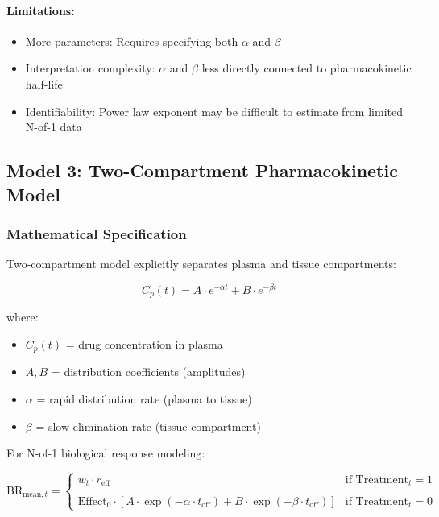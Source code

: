 \documentclass[11pt,a4paper]{article}
\begin{document}
\paragraph{Limitations:}
\begin{itemize}
  \item More parameters: Requires specifying both $\alpha$ and $\beta$
  \item Interpretation complexity: $\alpha$ and $\beta$ less directly connected to pharmacokinetic half-life
  \item Identifiability: Power law exponent may be difficult to estimate from limited N-of-1 data
\end{itemize}

\subsection{Model 3: Two-Compartment Pharmacokinetic Model}
\label{subsec:twocomp}

\subsubsection{Mathematical Specification}

Two-compartment model explicitly separates plasma and tissue compartments:

\begin{equation}
  C_p(t) = A \cdot e^{-\alpha t} + B \cdot e^{-\beta t}
\end{equation}

where:
\begin{itemize}
  \item $C_p(t)$ = drug concentration in plasma
  \item $A, B$ = distribution coefficients (amplitudes)
  \item $\alpha$ = rapid distribution rate (plasma to tissue)
  \item $\beta$ = slow elimination rate (tissue compartment)
\end{itemize}

For N-of-1 biological response modeling:

\begin{equation}
  \text{BR}_{\text{mean},t} = \begin{cases}
    w_t \cdot r_{\text{eff}} & \text{if } \text{Treatment}_t = 1 \\
    \\
    \text{Effect}_0 \cdot \left[ A \cdot \exp(-\alpha \cdot t_{\text{off}}) + B \cdot \exp(-\beta \cdot t_{\text{off}}) \right] & \text{if } \text{Treatment}_t = 0
  \end{cases}
\end{equation}
\end{document}
